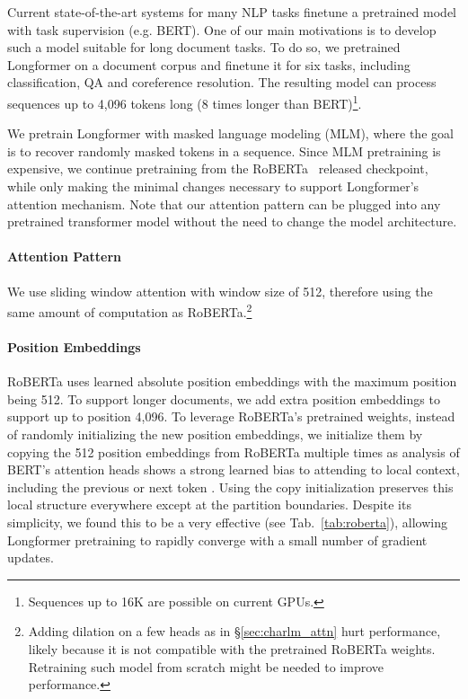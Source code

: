 \documentclass[11pt,a4paper]{article}
\newcommand{\model}{Longformer\xspace}
\begin{document}
Current state-of-the-art systems for many NLP tasks finetune a pretrained model with task supervision (e.g. BERT).
One of our main motivations is to develop such a model suitable for long document tasks.
To do so, we pretrained \model on a document corpus and finetune it for six tasks, including classification, QA and coreference resolution.
The resulting model can process sequences up to 4,096 tokens long (8 times longer than BERT)\footnote{Sequences up to 16K are possible on current GPUs.}.







We pretrain \model with masked language modeling (MLM), where the goal is to recover randomly masked tokens in a sequence. 
Since MLM pretraining is expensive, we continue pretraining from the RoBERTa~\cite{roberta} released checkpoint, while only making the minimal changes necessary to support \model's attention mechanism.
Note that our attention pattern can be plugged into any pretrained transformer model without the need to change the model architecture. 



\paragraph{Attention Pattern}
We use sliding window attention with window size of 512, therefore using the same amount of computation as RoBERTa.\footnote{Adding dilation on a few heads as in \S\ref{sec:charlm_attn} hurt performance, likely because it is not compatible with the pretrained RoBERTa weights. Retraining such model from scratch might be needed to improve performance.
}


\paragraph{Position Embeddings}
RoBERTa uses learned absolute position embeddings with the maximum 
position being 512. To support longer documents, we add extra position embeddings to support up to position 4,096. 
To leverage RoBERTa's pretrained weights, instead of randomly initializing the new position embeddings, we initialize them by copying the 512 position
embeddings from RoBERTa multiple times as analysis of BERT's attention heads shows a strong learned bias to attending to local context, including the previous or next token \cite{Clark2019WhatDB}.  Using the copy initialization preserves this local structure everywhere except at the partition boundaries.
Despite its simplicity, we found this to be a very effective (see Tab.~\ref{tab:roberta}), allowing \model pretraining to rapidly converge with a small number of gradient updates.
\end{document}
